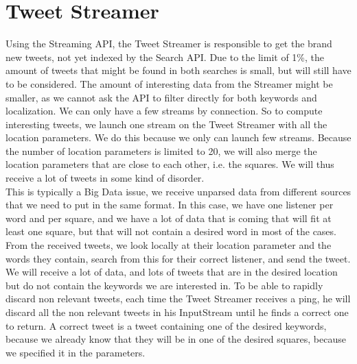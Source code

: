\section{Tweet Streamer}
Using the Streaming API, the Tweet Streamer is responsible to get the brand new tweets, not yet indexed by the Search API. Due to the limit of 1\%, the amount of tweets that might be found in both searches is small, but will still have to be considered. The amount of interesting data from the Streamer might be smaller, as we cannot ask the API to filter directly for both keywords and localization. We can only have a few streams by connection. So to compute interesting tweets, we launch one stream on the Tweet Streamer with all the location parameters. We do this because we only can launch few streams. Because the number of location parameters is limited to 20, we will also merge the location parameters that are close to each other, i.e. the squares. We will thus receive a lot of tweets in some kind of disorder. \\
This is typically a Big Data issue, we receive unparsed data from different sources that we need to put in the same format. In this case, we have one listener per word and per square, and we have a lot of data that is coming that will fit at least one square, but that will not contain a desired word in most of the cases.\\
From the received tweets, we look locally at their location parameter and the words they contain, search from this for their correct listener, and send the tweet. We will receive a lot of data, and lots of tweets that are in the desired location but do not contain the keywords we are interested in. To be able to rapidly discard non relevant tweets, each time the Tweet Streamer receives a ping, he will discard all the non relevant tweets in his InputStream until he finds a correct one to return. A correct tweet is a tweet containing one of the desired keywords, because we already know that they will be in one of the desired squares, because we specified it in the parameters.
